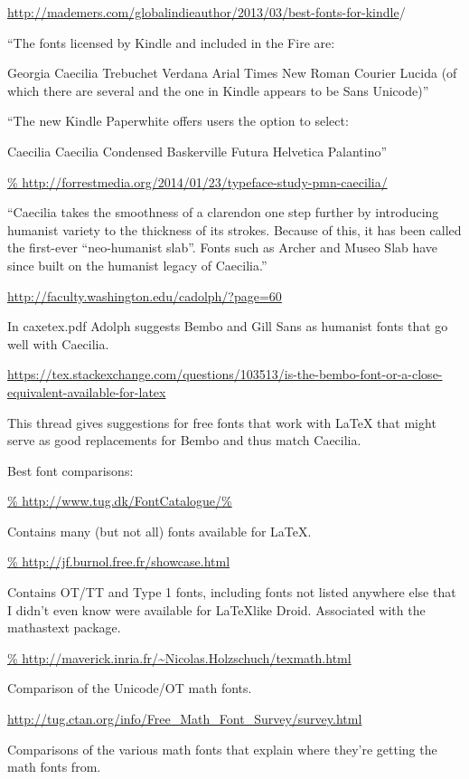 \documentclass[12pt]{article}
\begin{document}
\url{http://mademers.com/globalindieauthor/2013/03/best-fonts-for-kindle}/

``The fonts licensed by Kindle and included in the Fire are:

Georgia
Caecilia
Trebuchet
Verdana
Arial
Times New Roman
Courier
Lucida (of which there are several and the one in Kindle appears to be
Sans Unicode)''

``The new Kindle Paperwhite offers users the option to select:

Caecilia
Caecilia Condensed
Baskerville
Futura
Helvetica
Palantino''

\url{%
http://forrestmedia.org/2014/01/23/typeface-study-pmn-caecilia/
}

``Caecilia takes the smoothness of a clarendon one step further by introducing humanist variety to the thickness of its strokes. Because of this, it has been called the first-ever “neo-humanist slab”. Fonts such as Archer and Museo Slab have since built on the humanist legacy of Caecilia.''

\url{
  http://faculty.washington.edu/cadolph/?page=60
}

In caxetex.pdf Adolph suggests Bembo and Gill Sans as humanist fonts
that go well with Caecilia.

\url{
https://tex.stackexchange.com/questions/103513/is-the-bembo-font-or-a-close-equivalent-available-for-latex
}

This thread gives suggestions for free fonts that work with \LaTeX
that might serve as good replacements for Bembo and thus match Caecilia.


Best font comparisons:

\url{%
  http://www.tug.dk/FontCatalogue/%
}

Contains many (but not all) fonts available for \LaTeX.

\url{%
  http://jf.burnol.free.fr/showcase.html
}

Contains OT/TT and Type 1 fonts, including fonts not listed anywhere
else that I didn't even know were available for \LaTeX like Droid.
Associated with the mathastext package.

\url{%
  http://maverick.inria.fr/~Nicolas.Holzschuch/texmath.html
}

Comparison of the Unicode/OT math fonts.

\url{
http://tug.ctan.org/info/Free_Math_Font_Survey/survey.html
}

Comparisons of the various math fonts that explain where they're
getting the math fonts from.
\end{document}
